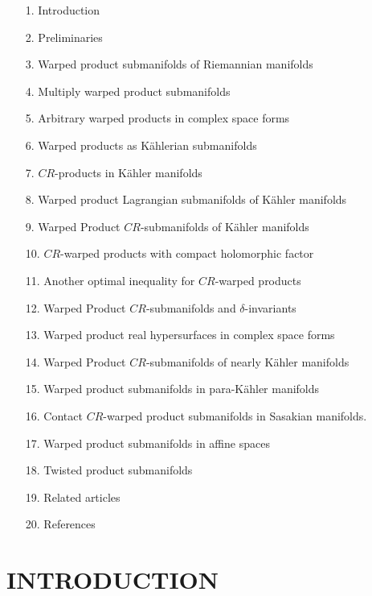 \documentclass{amsart}
\theoremstyle{plain}
\numberwithin{equation}{section}
\theoremstyle{remark}
\numberwithin{equation}{section}
\begin{document}
\begin{enumerate}
\item[1.]  Introduction                             

\item[2.] Preliminaries
\item[3.]  Warped product submanifolds of Riemannian manifolds 
\item[4.]  Multiply warped product submanifolds 
\item[5.]  Arbitrary warped products in complex space forms 
\item[6.]  Warped products as K\"ahlerian submanifolds 
\item[7.] $CR$-products in K\"ahler manifolds 
\item[8.] Warped product Lagrangian submanifolds of K\"ahler manifolds 
\item[9.]  Warped Product $CR$-submanifolds of K\"ahler manifolds 
\item[10.] $CR$-warped products with compact holomorphic factor 
\item[11.]  Another optimal inequality for $CR$-warped products 
\item[12.] Warped Product $CR$-submanifolds and $\delta$-invariants 
\item[13.]  Warped product real hypersurfaces in complex space forms 
\item[14.]  Warped Product $CR$-submanifolds of nearly K\"ahler manifolds 
\item[15.] Warped product submanifolds in para-K\"ahler manifolds 
\item[16.] Contact $CR$-warped product submanifolds in Sasakian manifolds. 
\item[17.] Warped product submanifolds in affine spaces 
\item[18.] Twisted product submanifolds 

\item[19.] Related articles 

\item[20.] References 
\end{enumerate}

\section{\uppercase{Introduction}}
\end{document}
